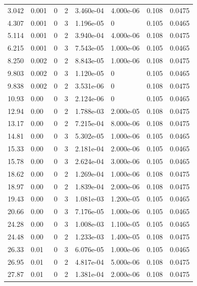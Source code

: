 \documentclass[preview]{standalone}
\begin{document}
{{\begin{tabular}{L{1.2cm}C{1.2cm} C{0.3cm}C{0.5cm} C{1.4cm}C{1.4cm} C{1.4cm}C{1.4cm}}
  3.042  &  0.001  & 0     &  2 &  3.460e-04  & 4.000e-06  & 0.108 &  0.0475   \\ 
  4.307  &  0.001  & 0     &  3 &  1.196e-05  & 0  & 0.105 &  0.0465   \\ 
  5.114  &  0.001  & 0     &  2 &  3.940e-04  & 4.000e-06  & 0.108 &  0.0475   \\ 
  6.215  &  0.001  & 0     &  3 &  7.543e-05  & 1.000e-06  & 0.105 &  0.0465   \\ 
  8.250  &  0.002  & 0     &  2 &  8.843e-05  & 1.000e-06  & 0.108 &  0.0475   \\ 
  9.803  &  0.002  & 0     &  3 &  1.120e-05  & 0  & 0.105 &  0.0465   \\ 
  9.838  &  0.002  & 0     &  2 &  3.531e-06  & 0  & 0.108 &  0.0475   \\ 
  10.93  &  0.00  & 0     &  3 &  2.124e-06  & 0  & 0.105 &  0.0465   \\ 
  12.94  &  0.00  & 0     &  2 &  1.788e-03  & 2.000e-05  & 0.108 &  0.0475   \\ 
  13.17  &  0.00  & 0     &  2 &  7.215e-04  & 8.000e-06  & 0.108 &  0.0475   \\ 
  14.81  &  0.00  & 0     &  3 &  5.302e-05  & 1.000e-06  & 0.105 &  0.0465   \\ 
  15.33  &  0.00  & 0     &  3 &  2.181e-04  & 2.000e-06  & 0.105 &  0.0465   \\ 
  15.78  &  0.00  & 0     &  3 &  2.624e-04  & 3.000e-06  & 0.105 &  0.0465   \\ 
  18.62  &  0.00  & 0     &  2 &  1.269e-04  & 1.000e-06  & 0.108 &  0.0475   \\ 
  18.97  &  0.00  & 0     &  2 &  1.839e-04  & 2.000e-06  & 0.108 &  0.0475   \\ 
  19.43  &  0.00  & 0     &  3 &  1.081e-03  & 1.200e-05  & 0.105 &  0.0465   \\ 
  20.66  &  0.00  & 0     &  3 &  7.176e-05  & 1.000e-06  & 0.105 &  0.0465   \\ 
  24.28  &  0.00  & 0     &  3 &  1.008e-03  & 1.100e-05  & 0.105 &  0.0465   \\ 
  24.48  &  0.00  & 0     &  2 &  1.233e-03  & 1.400e-05  & 0.108 &  0.0475   \\ 
  26.33  &  0.01  & 0     &  3 &  6.076e-05  & 1.000e-06  & 0.105 &  0.0465   \\ 
  26.95  &  0.01  & 0     &  2 &  4.817e-04  & 5.000e-06  & 0.108 &  0.0475   \\ 
  27.87  &  0.01  & 0     &  2 &  1.381e-04  & 2.000e-06  & 0.108 &  0.0475   \\ 

\end{tabular}}}
\end{document}
